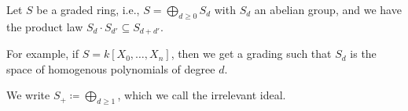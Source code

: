 Let $S$ be a graded ring, i.e., $S = \bigoplus_{d\geq 0} S_d$ with $S_d$ an abelian
group, and we have the product law $S_d\cdot S_{d'} \subseteq S_{d+d'}$.

For example, if $S = k[X_0, \ldots, X_n]$, then we get a grading such that $S_d$
is the space of homogenous polynomials of degree $d$.

We write $S_+ \coloneqq \bigoplus_{d\geq 1}$, which we call the irrelevant ideal.
